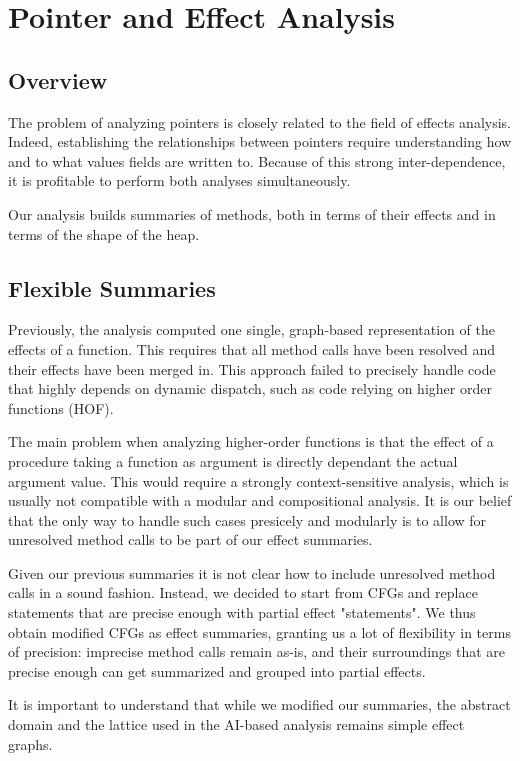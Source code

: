 \documentclass[a4paper]{article}
\begin{document}
\section{Pointer and Effect Analysis}
\subsection{Overview}
The problem of analyzing pointers is closely related to the field of effects
analysis. Indeed, establishing the relationships between pointers require
understanding how and to what values fields are written to. Because of this
strong inter-dependence, it is profitable to perform both analyses simultaneously.

Our analysis builds summaries of methods, both in terms of their effects and in
terms of the shape of the heap.

\subsection{Flexible Summaries}
Previously, the analysis computed one single, graph-based representation of the
effects of a function. This requires that all method calls have been resolved
and their effects have been merged in. This approach failed to precisely handle
code that highly depends on dynamic dispatch, such as code relying on higher
order functions (HOF).

The main problem when analyzing higher-order functions is that the effect of a
procedure taking a function as argument is directly dependant the actual
argument value. This would require a strongly context-sensitive analysis, which
is usually not compatible with a modular and compositional analysis. It is our
belief that the only way to handle such cases presicely and modularly is to
allow for unresolved method calls to be part of our effect summaries.

Given our previous summaries it is not clear how to include unresolved method
calls in a sound fashion. Instead, we decided to start from CFGs and replace
statements that are precise enough with partial effect "statements". We thus
obtain modified CFGs as effect summaries, granting us a lot of flexibility in
terms of precision: imprecise method calls remain as-is, and their surroundings
that are precise enough can get summarized and grouped into partial effects.

It is important to understand that while we modified our summaries, the
abstract domain and the lattice used in the AI-based analysis remains simple
effect graphs.
\end{document}
